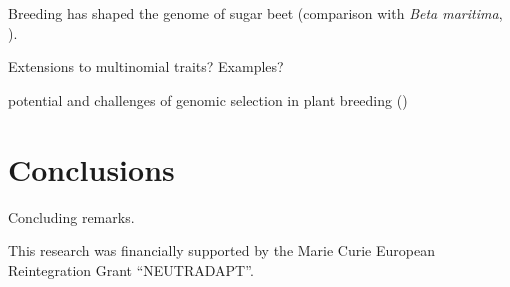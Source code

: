 Breeding has shaped the genome of sugar beet (comparison with \emph{Beta
  maritima}, \cite{dohm2013genome}).

Extensions to multinomial traits? Examples?

potential and challenges of genomic selection in plant breeding (\cite{jonas2013does})

%

\section{Conclusions}
\label{sec:conclusions}

Concluding remarks. 


\begin{acknowledgements}
This research was financially supported by the Marie Curie European
Reintegration Grant ``NEUTRADAPT''.
\end{acknowledgements}


